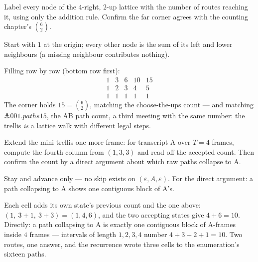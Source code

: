 \begin{problem}
Label every node of the $4$-right, $2$-up lattice with the number of
routes reaching it, using only the addition rule. Confirm the far
corner agrees with the counting chapter's $\binom{6}{2}$.
\begin{hint}
Start with $1$ at the origin; every other node is the sum of its left
and lower neighbours (a missing neighbour contributes nothing).
\end{hint}
\begin{solution}
Filling row by row (bottom row first):
\[
\begin{matrix}
1 & 3 & 6 & 10 & 15\\
1 & 2 & 3 & 4 & 5\\
1 & 1 & 1 & 1 & 1
\end{matrix}
\]
The corner holds $15 = \binom{6}{2}$, matching the choose-the-ups
count — and matching $\anchor{001.paths15}$, the AB path count, a
third meeting with the same number: the trellis \emph{is} a lattice
walk with different legal steps.
\end{solution}
\end{problem}

\begin{problem}
Extend the mini trellis one more frame: for transcript A over $T = 4$
frames, compute the fourth column from $(1, 3, 3)$ and read off the
accepted count. Then confirm the count by a direct argument about
which raw paths collapse to A.
\begin{hint}
Stay and advance only — no skip exists on $(\varepsilon, A,
\varepsilon)$. For the direct argument: a path collapsing to A shows
one contiguous block of A's.
\end{hint}
\begin{solution}
Each cell adds its own state's previous count and the one above:
$(1,\ 3{+}1,\ 3{+}3) = (1, 4, 6)$, and the two accepting states give
$4 + 6 = 10$. Directly: a path collapsing to A is exactly one
contiguous block of A-frames inside $4$ frames — intervals of length
$1, 2, 3, 4$ number $4 + 3 + 2 + 1 = 10$. Two routes, one answer,
and the recurrence wrote three cells to the enumeration's sixteen
paths.
\end{solution}
\end{problem}

